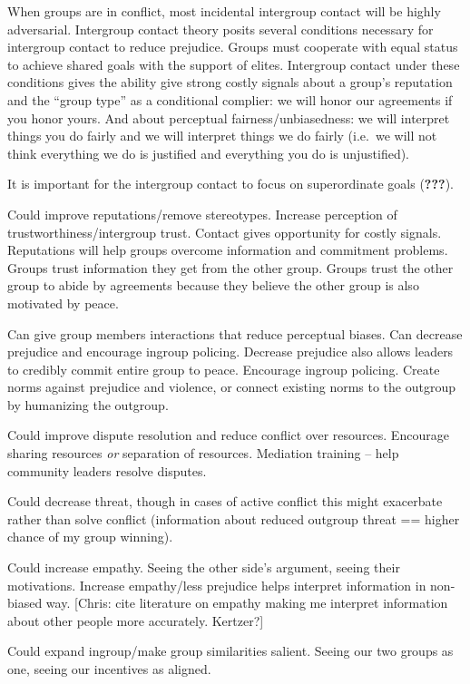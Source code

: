 \documentclass[11pt]{article}
\begin{document}
When groups are in conflict, most incidental intergroup contact will be
highly adversarial. Intergroup contact theory posits several conditions
necessary for intergroup contact to reduce prejudice. Groups must
cooperate with equal status to achieve shared goals with the support of
elites. Intergroup contact under these conditions gives the ability give
strong costly signals about a group's reputation and the ``group type''
as a conditional complier: we will honor our agreements if you honor
yours. And about perceptual fairness/unbiasedness: we will interpret
things you do fairly and we will interpret things we do fairly (i.e.~we
will not think everything we do is justified and everything you do is
unjustified).

It is important for the intergroup contact to focus on superordinate
goals ({\textbf{???}}).

Could improve reputations/remove stereotypes. Increase perception of
trustworthiness/intergroup trust. Contact gives opportunity for costly
signals. Reputations will help groups overcome information and
commitment problems. Groups trust information they get from the other
group. Groups trust the other group to abide by agreements because they
believe the other group is also motivated by peace.

Can give group members interactions that reduce perceptual biases. Can
decrease prejudice and encourage ingroup policing. Decrease prejudice
also allows leaders to credibly commit entire group to peace. Encourage
ingroup policing. Create norms against prejudice and violence, or
connect existing norms to the outgroup by humanizing the outgroup.

Could improve dispute resolution and reduce conflict over resources.
Encourage sharing resources \emph{or} separation of resources. Mediation
training -- help community leaders resolve disputes.

Could decrease threat, though in cases of active conflict this might
exacerbate rather than solve conflict (information about reduced
outgroup threat == higher chance of my group winning).

Could increase empathy. Seeing the other side's argument, seeing their
motivations. Increase empathy/less prejudice helps interpret information
in non-biased way. {[}Chris: cite literature on empathy making me
interpret information about other people more accurately. Kertzer?{]}

Could expand ingroup/make group similarities salient. Seeing our two
groups as one, seeing our incentives as aligned.
\end{document}
